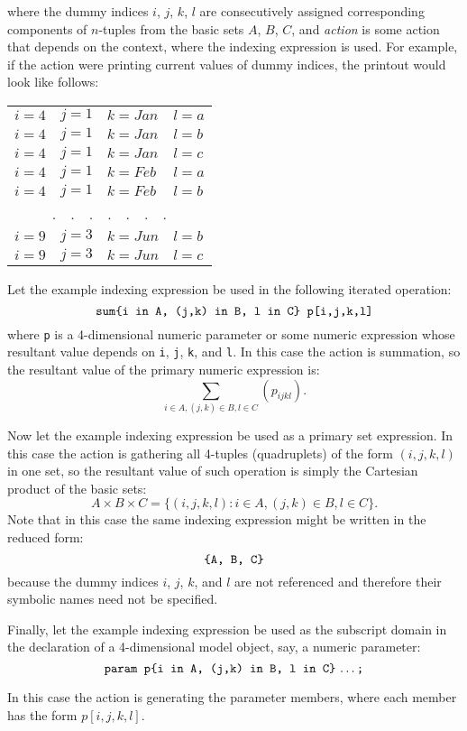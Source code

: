 \documentclass[11pt]{report}
\begin{document}
\noindent where the dummy indices $i$, $j$, $k$, $l$ are consecutively
assigned corresponding components of $n$-tuples from the basic sets $A$,
$B$, $C$, and {\it action} is some action that depends on the context,
where the indexing expression is used. For example, if the action were
printing current values of dummy indices, the printout would look like
follows:

\noindent\hfil
\begin{tabular}{@{}llll@{}}
$i=4$&$j=1$&$k=Jan$&$l=a$\\
$i=4$&$j=1$&$k=Jan$&$l=b$\\
$i=4$&$j=1$&$k=Jan$&$l=c$\\
$i=4$&$j=1$&$k=Feb$&$l=a$\\
$i=4$&$j=1$&$k=Feb$&$l=b$\\
\multicolumn{4}{c}{.\ \ .\ \ .\ \ .\ \ .\ \ .\ \ .}\\
$i=9$&$j=3$&$k=Jun$&$l=b$\\
$i=9$&$j=3$&$k=Jun$&$l=c$\\
\end{tabular}

Let the example indexing expression be used in the following iterated
operation:
$$\mbox{{\tt sum\{i in A, (j,k) in B, l in C\} p[i,j,k,l]}}$$
where {\tt p} is a 4-dimensional numeric parameter or some numeric
expression whose resultant value depends on {\tt i}, {\tt j}, {\tt k},
and {\tt l}. In this case the action is summation, so the resultant
value of the primary numeric expression is:
$$\sum_{i\in A,(j,k)\in B,l\in C}(p_{ijkl}).$$

Now let the example indexing expression be used as a primary set
expression. In this case the action is gathering all 4-tuples
(quadruplets) of the form $(i,j,k,l)$ in one set, so the resultant
value of such operation is simply the Cartesian product of the basic
sets:
$$A\times B\times C=\{(i,j,k,l):i\in A,(j,k)\in B,l\in C\}.$$
Note that in this case the same indexing expression might be written in
the reduced form:
$$\mbox{{\tt\{A, B, C\}}}$$
because the dummy indices $i$, $j$, $k$, and $l$ are not referenced and
therefore their symbolic names need not be specified.

\newpage

Finally, let the example indexing expression be used as the subscript
domain in the declaration of a 4-dimensional model object, say,
a numeric parameter:
$$\mbox{{\tt param p\{i in A, (j,k) in B, l in C\}} \dots {\tt;}}$$

\noindent In this case the action is generating the parameter members,
where each member has the form $p[i,j,k,l]$.
\end{document}
